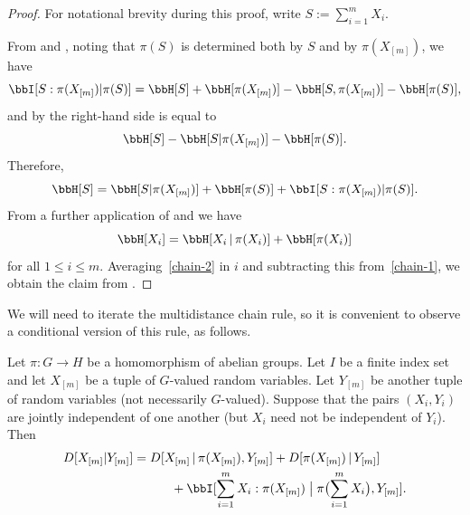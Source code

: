   \begin{proof}\leanok For notational brevity during this proof, write $S := \sum_{i=1}^m X_i$.

    From  and , noting that $\pi(S)$ is determined both by $S$ and by $\pi(X_{[m]})$, we have
  \begin{equation*}
   \bbI[S:\pi(X_{[m]})|\pi(S)] = \bbH[S]+\bbH[\pi(X_{[m]})]-\bbH[S,\pi(X_{[m]})]-\bbH[\pi(S)],
  \end{equation*}
  and by  the right-hand side is equal to
  \begin{equation*}
  \bbH[S]-\bbH[S|\pi(X_{[m]})]-\bbH[\pi(S)].
  \end{equation*}
  Therefore,
  \begin{equation}\label{chain-1}
  \bbH[S]=\bbH[S|\pi(X_{[m]})]+\bbH[\pi(S)]+\bbI[S:\pi(X_{[m]})|\pi(S)]. \end{equation}
  From a further application of  and  we have
  \begin{equation}\label{chain-2}
    \bbH[X_i] = \bbH[X_i \, | \, \pi(X_i)] + \bbH[\pi(X_i)]
  \end{equation}
  for all $1 \leq i \leq m$.  Averaging~\eqref{chain-2} in $i$ and subtracting this from~\eqref{chain-1}, we obtain the claim from .
  \end{proof}

  We will need to iterate the multidistance chain rule, so it is convenient to observe a conditional version of this rule, as follows.

  \begin{lemma}\label{multidist-chain-rule-cond}\leanok
    Let $\pi \colon G \to H$ be a homomorphism of abelian groups.
    Let $I$ be a finite index set and let $X_{[m]}$ be a tuple of $G$-valued random variables.
    Let $Y_{[m]}$ be another tuple of random variables (not necessarily $G$-valued).
    Suppose that the pairs $(X_i, Y_i)$ are jointly independent of one another (but $X_i$ need not be independent of $Y_i$).
    Then
    \begin{align}\nonumber
        D[ X_{[m]} | Y_{[m]} ] &=  D[ X_{[m]} \,|\, \pi(X_{[m]}), Y_{[m]}] + D[ \pi(X_{[m]}) \,|\, Y_{[m]}] \\
         &\quad\qquad + \bbI[ \sum_{i=1}^m X_i : \pi(X_{[m]}) \; \big| \;  \pi\bigl(\sum_{i=1}^m X_i \bigr), Y_{[m]} ].\label{chain-eq-cond}
    \end{align}
  \end{lemma}


